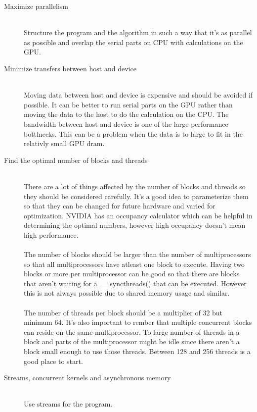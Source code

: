 \documentclass[10pt,a4paper]{article}
\begin{document}
\begin{description}
  \item[Maximize parallelism] \hfill \\
  Structure the program and the algorithm in such a way that it's as parallel as possible and overlap the serial parts on CPU with calculations on the GPU.\cite{plink_gpu, cuda}
  \item[Minimize transfers between host and device] \hfill \\
  Moving data between host and device is expensive and should be avoided if possible. It can be better to run serial parts on the GPU rather than moving the data to the host to do the calculation on the CPU. The bandwidth between host and device is one of the large performance bottlnecks. This can be a problem when the data is to large to fit in the relativly small GPU dram.\cite{cuda, cuda_best_practice}
  \item[Find the optimal number of blocks and threads] \hfill \\
  There are a lot of things affected by the number of blocks and threads so they should be considered carefully. It's a good idea to parameterize them so that they can be changed for future hardware and varied for optimization. NVIDIA has an occupancy calculator which can be helpful in determining the optimal numbers, however high occupancy doesn't mean high performance.\cite{cuda, cuda_best_practice}\\
  \\
  The number of blocks should be larger than the number of multiprocessors so that all multiprocessors have atleast one block to execute. Having two blocks or more per multiprocessor can be good so that there are blocks that aren't waiting for a \_\_syncthreads() that can be executed. However this is not always possible due to shared memory usage and similar.\cite{cuda_best_practice}\\
  \\  
  The number of threads per block should be a multiplier of 32 but minimum 64. It's also important to rember that multiple concurrent blocks can reside on the same multiprocessor. To large number of threads in a block and parts of the multiprocessor might be idle since there aren't a block small enough to use those threads. Between 128 and 256 threads is a good place to start.\cite{cuda_best_practice}
  

  \item[Streams, concurrent kernels and asynchronous memory] \hfill \\
  Use streams for the program.
  

\end{description}
\end{document}
